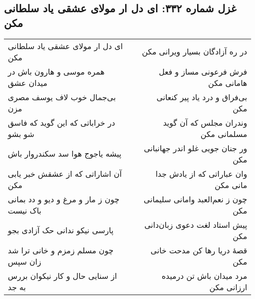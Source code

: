 \begin{center}
\section*{غزل شماره ۳۳۲: ای دل ار مولای عشقی یاد سلطانی مکن}
\label{sec:332}
\begin{longtable}{l p{0.5cm} r}
ای دل ار مولای عشقی یاد سلطانی مکن
&&
در ره آزادگان بسیار ویرانی مکن
\\
همره موسی و هارون باش در میدان عشق
&&
فرش فرعونی مساز و فعل هامانی مکن
\\
بی‌جمال خوب لاف یوسف مصری مزن
&&
بی‌فراق و درد یاد پیر کنعانی مکن
\\
در خراباتی که این گوید که فاسق شو بشو
&&
وندران مجلس که آن گوید مسلمانی مکن
\\
پیشه یاجوج هوا سد سکندروار باش
&&
ور جنان جویی غلو اندر جهانبانی مکن
\\
آن اشاراتی که از عشقش خبر یابی مکن
&&
وان عباراتی که از یادش جدا مانی مکن
\\
چون ز مار و مرغ و دیو و دد بمانی باک نیست
&&
چون ز نعم‌العبد وامانی سلیمانی مکن
\\
پارسی نیکو ندانی حک آزادی بجو
&&
پیش استاد لغت دعوی زبان‌دانی مکن
\\
چون مسلم زمزم و خانی ترا شد زان سپس
&&
قصهٔ دریا رها کن مدحت خانی مکن
\\
از سنایی حال و کار نیکوان بررس به جد
&&
مرد میدان باش تن درمیده ارزانی مکن
\\
\end{longtable}
\end{center}
